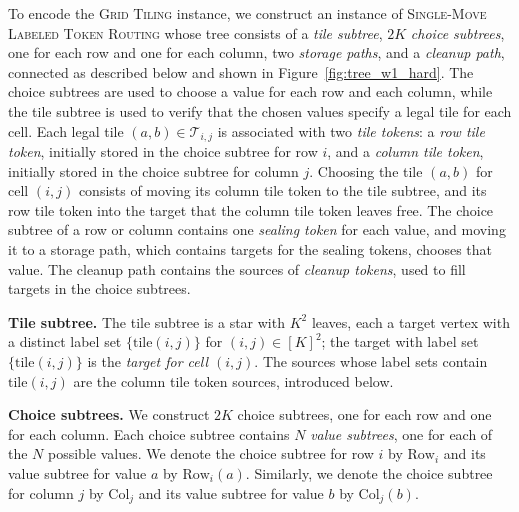 \documentclass[a4paper,USenglish,thm-restate]{lipics-v2021}
\newcommand{\rowsub}{\mathrm{Row}}
\newcommand{\colsub}{\mathrm{Col}}
\theoremstyle{problemstyle}
\begin{document}
To encode the \textsc{Grid Tiling} instance, we construct an instance of
\textsc{Single-Move Labeled Token Routing} whose tree consists of a
\emph{tile subtree}, $2K$ \emph{choice subtrees}, one for each row and one
for each column, two \emph{storage paths}, and a \emph{cleanup path},
connected as described below and shown in Figure~\ref{fig:tree_w1_hard}. The choice subtrees are
used to choose a value for each row and each column, while the tile subtree is
used to verify that the chosen values specify a legal tile for each cell.
Each legal tile $(a,b)\in \mathcal{T}_{i,j}$ is associated with two
\emph{tile tokens}: a \emph{row tile token}, initially stored in the choice
subtree for row $i$, and a \emph{column tile token}, initially stored in the
choice subtree for column $j$. Choosing the tile $(a,b)$ for cell $(i,j)$
consists of moving its column tile token to the tile subtree, and its row
tile token into the target that the column tile token leaves free. The
choice subtree of a row or column contains one \emph{sealing token} for
each value, and moving it to a storage path, which contains targets for
the sealing tokens, chooses that value. The cleanup path contains the
sources of \emph{cleanup tokens}, used to fill targets in the choice
subtrees.

\smallskip
\noindent\textbf{Tile subtree.}
The tile subtree is a star with $K^2$ leaves, each a target vertex with a
distinct label set $\{\mathrm{tile}(i,j)\}$ for $(i,j)\in[K]^2$; the target
with label set $\{\mathrm{tile}(i,j)\}$ is the \emph{target for cell
$(i,j)$}. The sources whose label sets contain $\mathrm{tile}(i,j)$ are the
column tile token sources, introduced below.

\smallskip
\noindent\textbf{Choice subtrees.}
We construct $2K$ choice subtrees, one for each row and one for each column.
Each choice subtree contains $N$ \emph{value subtrees}, one for each of the
$N$ possible values. We denote the choice subtree for row $i$ by $\rowsub_i$
and its value subtree for value $a$ by $\rowsub_i(a)$. Similarly, we denote
the choice subtree for column $j$ by $\colsub_j$ and its value subtree for
value $b$ by $\colsub_j(b)$.
\end{document}
